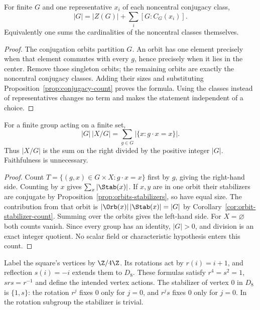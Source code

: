 \begin{theorem}\label{thm:class-equation}
For finite $G$ and one representative $x_i$ of each noncentral conjugacy class,
\[
 |G|=|Z(G)|+\sum_i[G:C_G(x_i)].
\]
Equivalently one sums the cardinalities of the noncentral classes themselves.
\end{theorem}
\begin{proof}
The conjugation orbits partition $G$. An orbit has one element precisely when that element commutes with every $g$, hence precisely when it lies in the center. Remove those singleton orbits; the remaining orbits are exactly the noncentral conjugacy classes. Adding their sizes and substituting Proposition~\ref{prop:conjugacy-count} proves the formula. Using the classes instead of representatives changes no term and makes the statement independent of a choice.
\end{proof}

\begin{theorem}\label{thm:burnside}
For a finite group acting on a finite set,
\[
 |G|\,|X/G|=\sum_{g\in G}|\{x:g\cdot x=x\}|.
\]
Thus $|X/G|$ is the sum on the right divided by the positive integer $|G|$. Faithfulness is unnecessary.
\end{theorem}
\begin{proof}
Count $T=\{(g,x)\in G\times X:g\cdot x=x\}$ first by $g$, giving the right-hand side. Counting by $x$ gives $\sum_x|\Stab(x)|$. If $x,y$ are in one orbit their stabilizers are conjugate by Proposition~\ref{prop:orbits-stabilizers}, so have equal size. The contribution from that orbit is $|\Orb(x)|\,|\Stab(x)|=|G|$ by Corollary~\ref{cor:orbit-stabilizer-count}. Summing over the orbits gives the left-hand side. For $X=\varnothing$ both counts vanish. Since every group has an identity, $|G|>0$, and division is an exact integer quotient. No scalar field or characteristic hypothesis enters this count.
\end{proof}

Label the square's vertices by $\Z/4\Z$. Its rotations act by $r(i)=i+1$, and reflection $s(i)=-i$ extends them to $D_8$. These formulas satisfy $r^4=s^2=1$, $srs=r^{-1}$ and define the intended vertex actions. The stabilizer of vertex $0$ in $D_8$ is $\{1,s\}$: the rotation $r^j$ fixes $0$ only for $j=0$, and $r^js$ fixes $0$ only for $j=0$. In the rotation subgroup the stabilizer is trivial.

